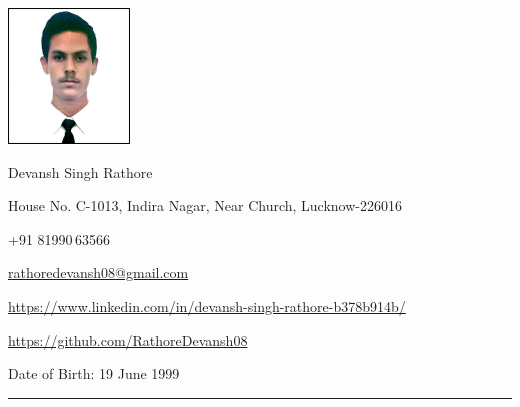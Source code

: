 \documentclass[a4paper,10pt]{article}
\newlength{\cvcolumngapwidth}
\newlength{\cvleftcolumnwidth}
\newlength{\cvrightcolumnwidth}
\newcommand{\cvnamestyle}[1]{{\Large\cvnamefont\textcolor{cvnamecolor}{#1}}}
\newcommand{\cvsectionstyle}[1]{{\normalsize\cvsectionfont\textcolor{cvsectioncolor}{#1}}}
\newcommand{\cvtitlestyle}[1]{{\large\cvtitlefont\textcolor{cvtitlecolor}{#1}}}
\newcommand{\cvdurationstyle}[1]{{\small\cvdurationfont\textcolor{cvdurationcolor}{#1}}}
\newlength{\cvafteritemskipamount}
\newlength{\cvaftersectionskipamount}
\newlength{\cvafternameskipamount}
\newlength{\cvafterpersonalinfolineskipamount}
\newlength{\cvaftertitleskipamount}
\newlength{\cvparskip}
\newcommand{\cvpersonalinfo}[2]{
    \begin{minipage}[t]{\cvleftcolumnwidth}
        \vspace{0mm} %
        \raggedleft #1
    \end{minipage}%
    \hspace{\cvcolumngapwidth}%
    \begin{minipage}[t]{\cvrightcolumnwidth}
        \vspace{0mm} %
        #2
    \end{minipage}

    \vspace{\cvafteritemskipamount}
}
\newcommand{\cvname}[1]{
    \cvnamestyle{#1}

    \vspace{\cvafternameskipamount}
}
\newcommand{\cvpersonalinfolinewithicon}[3]{
    \raisebox{.5\fontcharht\font`E-.5\height}{\texttt{[image: \#2]}}
    #3

    \vspace{\cvafterpersonalinfolineskipamount}
}
\newcommand{\cvsection}[1]{
    \begin{minipage}[t]{\cvleftcolumnwidth}
        \raggedleft\cvsectionstyle{#1}
    \end{minipage}%
    \hspace{\cvcolumngapwidth}%
    \begin{minipage}[t]{\cvrightcolumnwidth}
        \textcolor{cvrulecolor}{\rule{\cvrightcolumnwidth}{0.3mm}}
    \end{minipage}

    \vspace{\cvaftersectionskipamount}
}
\newcommand{\cvitem}[2]{
    \begin{minipage}[t]{\cvleftcolumnwidth}
        \raggedleft #1
    \end{minipage}%
    \hspace{\cvcolumngapwidth}%
    \begin{minipage}[t]{\cvrightcolumnwidth}
        \setlength{\parskip}{\cvparskip} #2
    \end{minipage}

    \vspace{\cvafteritemskipamount}
}
\newcommand{\cvtitle}[1]{
    \cvtitlestyle{#1}

    \vspace{\cvaftertitleskipamount}
    \vspace{-\cvparskip}
}
\begin{document}

\cvpersonalinfo{
    \includegraphics[height=36mm]{new2.jpg}
}{
    \cvname{Devansh Singh Rathore}

    \cvpersonalinfolinewithicon{height=4mm}{072-location.pdf}{
        House No. C-1013, Indira Nagar, Near Church, Lucknow-226016
    }

    \cvpersonalinfolinewithicon{height=4mm}{067-phone.pdf}{
        +91 81990\,63566\
    }

    \cvpersonalinfolinewithicon{height=4mm}{070-envelop.pdf}{
        \href{mailto:rathoredevansh08@gmail.com}{rathoredevansh08@gmail.com}
    }

    \cvpersonalinfolinewithicon{height=4mm}{458-linkedin.pdf}{
        \url{https://www.linkedin.com/in/devansh-singh-rathore-b378b914b/}
    }
    
    \cvpersonalinfolinewithicon{height=4mm}{github.png.pdf}{
        \url{https://github.com/RathoreDevansh08}
    }

    Date of Birth:  19 June 1999
}




%




\cvsection{EDUCATION}
\end{document}
